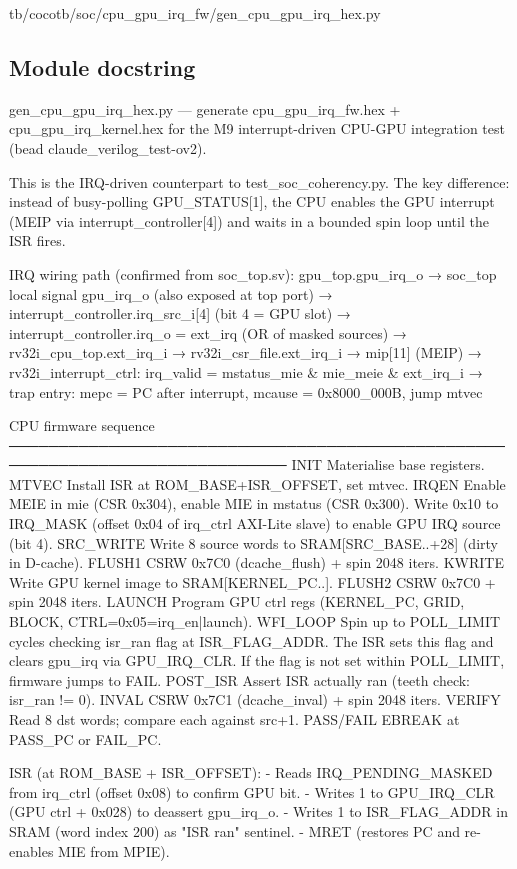 \begin{relocated}{tb/cocotb/soc/cpu_gpu_irq_fw/gen_cpu_gpu_irq_hex.py}

\subsection*{Module docstring}

\begin{textblock}
gen_cpu_gpu_irq_hex.py — generate cpu_gpu_irq_fw.hex + cpu_gpu_irq_kernel.hex
for the M9 interrupt-driven CPU-GPU integration test (bead claude_verilog_test-ov2).

This is the IRQ-driven counterpart to test_soc_coherency.py.  The key difference:
instead of busy-polling GPU_STATUS[1], the CPU enables the GPU interrupt (MEIP via
interrupt_controller[4]) and waits in a bounded spin loop until the ISR fires.

IRQ wiring path (confirmed from soc_top.sv):
gpu_top.gpu_irq_o
→ soc_top local signal gpu_irq_o (also exposed at top port)
→ interrupt_controller.irq_src_i[4]   (bit 4 = GPU slot)
→ interrupt_controller.irq_o = ext_irq  (OR of masked sources)
→ rv32i_cpu_top.ext_irq_i
→ rv32i_csr_file.ext_irq_i → mip[11] (MEIP)
→ rv32i_interrupt_ctrl: irq_valid = mstatus_mie & mie_meie & ext_irq_i
→ trap entry: mepc = PC after interrupt, mcause = 0x8000_000B, jump mtvec

CPU firmware sequence
──────────────────────────────────────────────────────────────────────────────
INIT       Materialise base registers.
MTVEC      Install ISR at ROM_BASE+ISR_OFFSET, set mtvec.
IRQEN      Enable MEIE in mie (CSR 0x304), enable MIE in mstatus (CSR 0x300).
Write 0x10 to IRQ_MASK (offset 0x04 of irq_ctrl AXI-Lite slave)
to enable GPU IRQ source (bit 4).
SRC_WRITE  Write 8 source words to SRAM[SRC_BASE..+28] (dirty in D-cache).
FLUSH1     CSRW 0x7C0 (dcache_flush) + spin 2048 iters.
KWRITE     Write GPU kernel image to SRAM[KERNEL_PC..].
FLUSH2     CSRW 0x7C0 + spin 2048 iters.
LAUNCH     Program GPU ctrl regs (KERNEL_PC, GRID, BLOCK, CTRL=0x05=irq_en|launch).
WFI_LOOP   Spin up to POLL_LIMIT cycles checking isr_ran flag at ISR_FLAG_ADDR.
The ISR sets this flag and clears gpu_irq via GPU_IRQ_CLR.
If the flag is not set within POLL_LIMIT, firmware jumps to FAIL.
POST_ISR   Assert ISR actually ran (teeth check: isr_ran != 0).
INVAL      CSRW 0x7C1 (dcache_inval) + spin 2048 iters.
VERIFY     Read 8 dst words; compare each against src+1.
PASS/FAIL  EBREAK at PASS_PC or FAIL_PC.

ISR (at ROM_BASE + ISR_OFFSET):
- Reads IRQ_PENDING_MASKED from irq_ctrl (offset 0x08) to confirm GPU bit.
- Writes 1 to GPU_IRQ_CLR (GPU ctrl + 0x028) to deassert gpu_irq_o.
- Writes 1 to ISR_FLAG_ADDR in SRAM (word index 200) as "ISR ran" sentinel.
- MRET (restores PC and re-enables MIE from MPIE).


\end{textblock}
\end{relocated}
